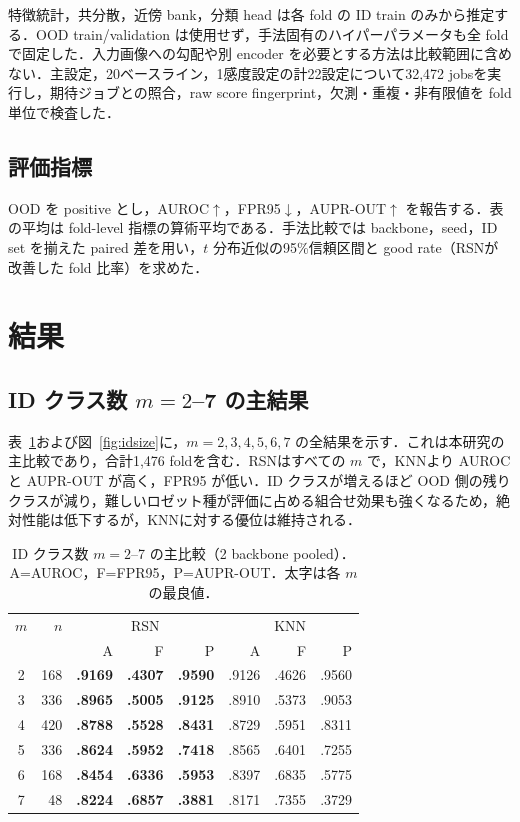\documentclass[uplatex,dvipdfmx,a4paper,10pt,twocolumn]{bxjsarticle}
\newcommand{\RSN}{RSN}
\newcommand{\knn}{KNN}
\newcommand{\good}{\mathop{\uparrow}}
\newcommand{\low}{\mathop{\downarrow}}
\begin{document}
特徴統計，共分散，近傍 bank，分類 head は各 fold の ID train のみから推定する．OOD train/validation は使用せず，手法固有のハイパーパラメータも全 foldで固定した．入力画像への勾配や別 encoder を必要とする方法は比較範囲に含めない．主設定，20ベースライン，1感度設定の計22設定について32,472 jobsを実行し，期待ジョブとの照合，raw score fingerprint，欠測・重複・非有限値を fold単位で検査した．

\subsection{評価指標}

OOD を positive とし，AUROC$\good$，FPR95$\low$，AUPR-OUT$\good$ を報告する．表の平均は fold-level 指標の算術平均である．手法比較では backbone，seed，ID set を揃えた paired 差を用い，$t$ 分布近似の95\%信頼区間と good rate（\RSN が改善した fold 比率）を求めた．

\section{結果}

\subsection{ID クラス数 $m=2$--7 の主結果}

表~\ref{tab:idsize}および図~\ref{fig:idsize}に，$m=2,3,4,5,6,7$ の全結果を示す．これは本研究の主比較であり，合計1,476 foldを含む．\RSN はすべての $m$ で，\knn より AUROC と AUPR-OUT が高く，FPR95 が低い．ID クラスが増えるほど OOD 側の残りクラスが減り，難しいロゼット種が評価に占める組合せ効果も強くなるため，絶対性能は低下するが，\knn に対する優位は維持される．

\begin{table}[t]
\centering
\scriptsize
\setlength{\tabcolsep}{5.0pt}
\caption{ID クラス数 $m=2$--7 の主比較（2 backbone pooled）．A=AUROC，F=FPR95，P=AUPR-OUT．太字は各 $m$ の最良値．}
\label{tab:idsize}
\begin{tabular}{crrrrrrr}
\toprule
$m$ & $n$ & \multicolumn{3}{c}{\RSN} & \multicolumn{3}{c}{\knn}\\
 & & A & F & P & A & F & P\\
\midrule
2 & 168 & \textbf{.9169} & \textbf{.4307} & \textbf{.9590} & .9126 & .4626 & .9560\\
3 & 336 & \textbf{.8965} & \textbf{.5005} & \textbf{.9125} & .8910 & .5373 & .9053\\
4 & 420 & \textbf{.8788} & \textbf{.5528} & \textbf{.8431} & .8729 & .5951 & .8311\\
5 & 336 & \textbf{.8624} & \textbf{.5952} & \textbf{.7418} & .8565 & .6401 & .7255\\
6 & 168 & \textbf{.8454} & \textbf{.6336} & \textbf{.5953} & .8397 & .6835 & .5775\\
7 &  48 & \textbf{.8224} & \textbf{.6857} & \textbf{.3881} & .8171 & .7355 & .3729\\
\bottomrule
\end{tabular}
\end{table}
\end{document}

